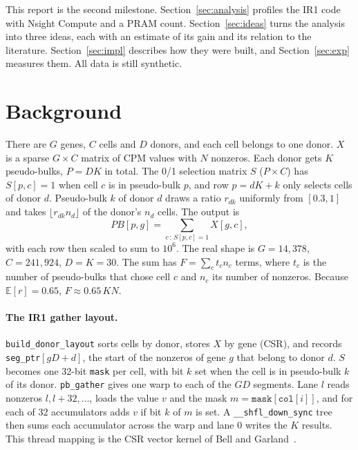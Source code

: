 \documentclass[sigconf,nonacm]{acmart}
\newcommand{\code}[1]{\texttt{#1}}
\begin{document}
This report is the second milestone. Section~\ref{sec:analysis} profiles the IR1 code with Nsight
Compute and a PRAM count. Section~\ref{sec:ideas} turns the analysis into three ideas, each with an
estimate of its gain and its relation to the literature. Section~\ref{sec:impl} describes how they
were built, and Section~\ref{sec:exp} measures them. All data is still synthetic.

\section{Background}

There are $G$ genes, $C$ cells and $D$ donors, and each cell belongs to one donor. $X$ is a sparse
$G \times C$ matrix of CPM values with $N$ nonzeros. Each donor gets $K$ pseudo-bulks, $P = DK$ in
total. The 0/1 selection matrix $S$ ($P \times C$) has $S[p,c] = 1$ when cell $c$ is in pseudo-bulk
$p$, and row $p = dK + k$ only selects cells of donor $d$. Pseudo-bulk $k$ of donor $d$ draws a ratio
$r_{dk}$ uniformly from $[0.3, 1]$ and takes $\lfloor r_{dk} n_d \rfloor$ of the donor's $n_d$ cells.
The output is
\begin{equation}
PB[p,g] = \sum_{c\,:\,S[p,c]=1} X[g,c],
\label{eq:pb}
\end{equation}
with each row then scaled to sum to $10^6$. The real shape is $G = 14{,}378$, $C = 241{,}924$,
$D = K = 30$. The sum has $F = \sum_c t_c n_c$ terms, where $t_c$ is the number of pseudo-bulks that
chose cell $c$ and $n_c$ its number of nonzeros. Because $\mathbb{E}[r] = 0.65$, $F \approx 0.65\,KN$.

\paragraph{The IR1 gather layout.} \code{build\_donor\_layout} sorts cells by donor, stores $X$ by gene
(CSR), and records \code{seg\_ptr}$[gD+d]$, the start of the nonzeros of gene $g$ that belong to donor
$d$. $S$ becomes one 32-bit \code{mask} per cell, with bit $k$ set when the cell is in pseudo-bulk $k$
of its donor. \code{pb\_gather} gives one warp to each of the $GD$ segments. Lane $l$ reads nonzeros
$l, l+32, \dots$, loads the value $v$ and the mask $m = \code{mask}[\code{col}[i]]$, and for each of
32 accumulators adds $v$ if bit $k$ of $m$ is set. A \code{\_\_shfl\_down\_sync} tree then sums each
accumulator across the warp and lane 0 writes the $K$ results. This thread mapping is the CSR vector
kernel of Bell and Garland~\cite{bell2008,bell2009}.
\end{document}
